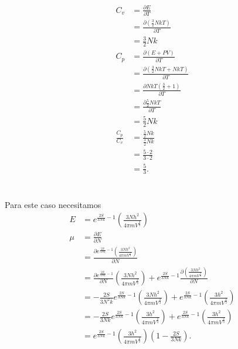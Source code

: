 \documentclass{report}
\begin{document}
\section{}

\begin{align*}
  C_v &= \frac{\partial E}{\partial T}\\
  &= \frac{\partial \left( \frac{3}{2} NkT\right)}{\partial T}\\
  &= \frac{3}{2} Nk\\
  C_p &= \frac{\partial \left(E + PV\right)}{\partial T}\\
  &= \frac{\partial \left(\frac{3}{2} NkT + NkT\right)}{\partial T}\\
  &= \frac{\partial NkT \left(\frac{3}{2} + 1\right)}{\partial T}\\
  &= \frac{\partial \frac{5}{2}NkT}{\partial T}\\
  &= \frac{5}{2} Nk\\
  \frac{C_p}{C_v} &= \frac{\frac{5}{2}Nk}{\frac{3}{2}Nk}\\
  &= \frac{5\cdot 2}{3 \cdot 2}\\
  &= \frac{5}{3}
.\end{align*}

\section{}

Para este caso necesitamos
\begin{align*}
  E &= e^{\frac{2S}{3Nk} -1} \left(\frac{3Nh^2}{4 \pi m V^{\frac{2}{3}}}\right)\\
  \mu &= \frac{\partial E}{\partial N}\\
  &= \frac{\partial e^{\frac{2S}{3Nk} -1} \left(\frac{3Nh^2}{4 \pi m V^{\frac{2}{3}}}\right)}{\partial N}\\
  &= \frac{\partial e^{\frac{2S}{3Nk} -1}}{\partial N} \left(\frac{3Nh^2}{4 \pi m V^{\frac{2}{3}}}\right) + e^{\frac{2S}{3Nk} -1}\frac{\partial \left(\frac{3Nh^2}{4 \pi m V^{\frac{2}{3}}}\right)}{\partial N}\\
  &= -\frac{2S}{3N^2 k}e^{\frac{2S}{3Nk} -1} \left(\frac{3Nh^2}{4 \pi m V^{\frac{2}{3}}}\right) + e^{\frac{2S}{3Nk} -1}\left(\frac{3h^2}{4 \pi m V^{\frac{2}{3}}}\right)\\
  &= -\frac{2S}{3N k}e^{\frac{2S}{3Nk} -1} \left(\frac{3h^2}{4 \pi m V^{\frac{2}{3}}}\right) + e^{\frac{2S}{3Nk} -1}\left(\frac{3h^2}{4 \pi m V^{\frac{2}{3}}}\right)\\
  &= e^{\frac{2S}{3Nk} -1} \left(\frac{3h^2}{4 \pi m V^{\frac{2}{3}}}\right)\left(1 -\frac{2S}{3N k} \right)
.\end{align*}
\end{document}
